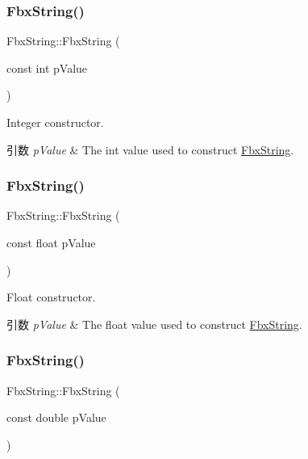 \subsubsection{\texorpdfstring{Fbx\+String()}{FbxString()}\hspace{0.1cm}{\footnotesize\ttfamily [6/8]}}
{\footnotesize\ttfamily Fbx\+String\+::\+Fbx\+String (\begin{DoxyParamCaption}\item[{const int}]{p\+Value }\end{DoxyParamCaption})}

Integer constructor. 
\begin{DoxyParams}{引数}
{\em p\+Value} & The int value used to construct \hyperlink{class_fbx_string}{Fbx\+String}. \\
\hline
\end{DoxyParams}
\mbox{\label{class_fbx_string_ada766330be76ca59b423fbb11adf2181}} 
\subsubsection{\texorpdfstring{Fbx\+String()}{FbxString()}\hspace{0.1cm}{\footnotesize\ttfamily [7/8]}}
{\footnotesize\ttfamily Fbx\+String\+::\+Fbx\+String (\begin{DoxyParamCaption}\item[{const float}]{p\+Value }\end{DoxyParamCaption})}

Float constructor. 
\begin{DoxyParams}{引数}
{\em p\+Value} & The float value used to construct \hyperlink{class_fbx_string}{Fbx\+String}. \\
\hline
\end{DoxyParams}
\mbox{\label{class_fbx_string_a9430a89dc9eac29f35291de87491691b}} 
\subsubsection{\texorpdfstring{Fbx\+String()}{FbxString()}\hspace{0.1cm}{\footnotesize\ttfamily [8/8]}}
{\footnotesize\ttfamily Fbx\+String\+::\+Fbx\+String (\begin{DoxyParamCaption}\item[{const double}]{p\+Value }\end{DoxyParamCaption})}


